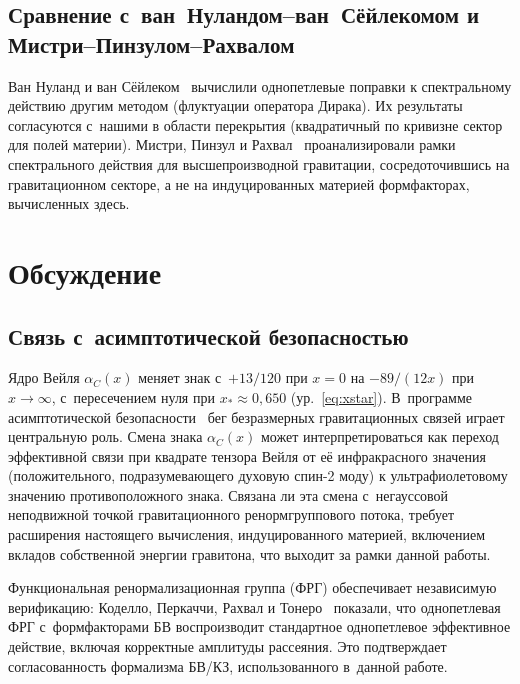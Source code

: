 \documentclass[aps,prd,twocolumn,superscriptaddress,nofootinbib,floatfix]{revtex4-2}
\theoremstyle{definition}
\theoremstyle{remark}
\begin{document}
\subsection{Сравнение с~ван~Нуландом--ван~Сёйлекомом и Мистри--Пинзулом--Рахвалом}

Ван Нуланд и ван Сёйлеком~\cite{vanNuland:2022xkm} вычислили однопетлевые
поправки к спектральному действию другим методом (флуктуации оператора
Дирака). Их результаты согласуются с~нашими в области перекрытия
(квадратичный по кривизне сектор для полей материи). Мистри, Пинзул и
Рахвал~\cite{Mistry:2020xqh} проанализировали рамки спектрального действия
для высшепроизводной гравитации, сосредоточившись на гравитационном секторе,
а не на индуцированных материей формфакторах, вычисленных здесь.


\section{Обсуждение}
\label{sec:discussion}

\subsection{Связь с~асимптотической безопасностью}

Ядро Вейля $\alpha_C(x)$ меняет знак с~$+13/120$ при $x = 0$ на
$-89/(12x)$ при $x \to \infty$, с~пересечением нуля при
$x_\ast \approx 0{,}650$ (ур.~\eqref{eq:xstar}). В~программе
асимптотической
безопасности~\cite{Reuter:1996cp,Codello:2008vh,FradkinTseytlin:1982}
бег безразмерных гравитационных связей играет центральную роль. Смена знака
$\alpha_C(x)$ может интерпретироваться как переход эффективной связи при
квадрате тензора Вейля от её инфракрасного значения (положительного,
подразумевающего духовую спин-2 моду) к ультрафиолетовому значению
противоположного знака. Связана ли эта смена с~негауссовой неподвижной
точкой гравитационного ренормгруппового потока, требует расширения
настоящего вычисления, индуцированного материей, включением вкладов
собственной энергии гравитона, что выходит за рамки данной работы.

Функциональная ренормализационная группа (ФРГ) обеспечивает независимую
верификацию: Коделло, Перкаччи, Рахвал и
Тонеро~\cite{Codello:2015oqa} показали, что однопетлевая ФРГ
с~формфакторами БВ воспроизводит стандартное однопетлевое эффективное
действие, включая корректные амплитуды рассеяния. Это подтверждает
согласованность формализма БВ/КЗ, использованного в~данной работе.
\end{document}
